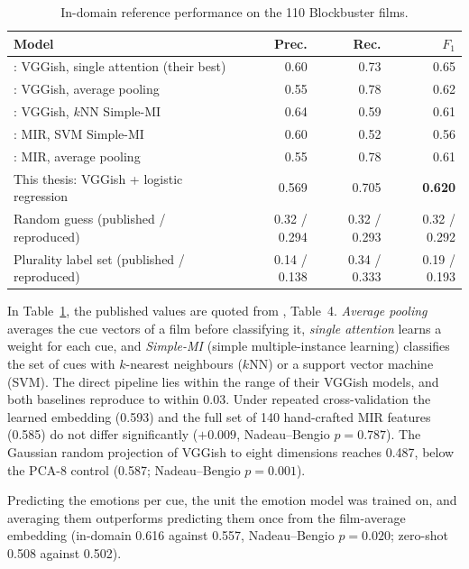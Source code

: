 \begin{table}[H]
  \centering
  \caption{In-domain reference performance on the 110 Blockbuster films.}
  \label{tab:blockbuster_reference}
  \small
  \setlength{\tabcolsep}{4pt}
  \begin{tabular}{lrrr}
    \toprule
    Model & Prec. & Rec. & $F_1$ \\
    \midrule
    \citeauthor{ma2021computational}: VGGish, single attention (their best) & 0.60 & 0.73 & 0.65 \\
    \citeauthor{ma2021computational}: VGGish, average pooling               & 0.55 & 0.78 & 0.62 \\
    \citeauthor{ma2021computational}: VGGish, $k$NN Simple-MI               & 0.64 & 0.59 & 0.61 \\
    \citeauthor{ma2021computational}: MIR, SVM Simple-MI                    & 0.60 & 0.52 & 0.56 \\
    \citeauthor{ma2021computational}: MIR, average pooling                  & 0.55 & 0.78 & 0.61 \\
    This thesis: VGGish + logistic regression                               & 0.569 & 0.705 & \textbf{0.620} \\
    \midrule
    Random guess (published / reproduced)     & 0.32 / 0.294 & 0.32 / 0.293 & 0.32 / 0.292 \\
    Plurality label set (published / reproduced) & 0.14 / 0.138 & 0.34 / 0.333 & 0.19 / 0.193 \\
    \bottomrule
  \end{tabular}
\end{table}

In Table~\ref{tab:blockbuster_reference}, the published values are quoted from
\citet{ma2021computational}, Table~4. \emph{Average pooling} averages the cue vectors of a
film before classifying it, \emph{single attention} learns a weight for each cue, and
\emph{Simple-MI} (simple multiple-instance learning) classifies the set of cues with
$k$-nearest neighbours ($k$NN) or a support vector machine (SVM).  The direct pipeline lies within the range of their VGGish models, and both baselines reproduce to within 0.03.
Under repeated cross-validation the learned embedding (0.593) and the full set of 140
hand-crafted MIR features (0.585) do not differ significantly ($+0.009$, Nadeau--Bengio
$p=0.787$). The Gaussian random projection of VGGish to eight dimensions reaches 0.487, below the
PCA-8 control (0.587; Nadeau--Bengio $p=0.001$).

Predicting the emotions per cue, the unit the emotion model was trained on, and averaging them
outperforms predicting them once from the film-average embedding (in-domain 0.616 against
0.557, Nadeau--Bengio $p=0.020$; zero-shot 0.508 against 0.502).

